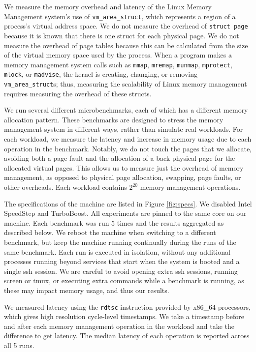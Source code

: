 \documentclass[twocolumn,11pt]{article}
\begin{document}
We measure the memory overhead and latency of the Linux Memory Management
system's use of \texttt{vm\_area\_struct}, which represents a region of a
process's virtual address space.  We do not measure the overhead of
\texttt{struct page} because it is known that there is one struct for each
physical page. We do not measure the overhead of page tables because this can be
calculated from the size of the virtual memory space used by the process.  When
a program makes a memory management system calls such as \texttt{mmap},
\texttt{mremap}, \texttt{munmap}, \texttt{mprotect}, \texttt{mlock}, or
\texttt{madvise}, the kernel is creating, changing, or removing
\texttt{vm\_area\_struct}s; thus, measuring the scalability of Linux memory
management requires measuring the overhead of these structs.

We run several different microbenchmarks, each of which has a different memory
allocation pattern. These benchmarks are designed to stress the memory
management system in different ways, rather than simulate real workloads. For
each workload, we measure the latency and increase in memory usage due to each
operation in the benchmark. Notably, we do not touch the pages that we allocate,
avoiding both a page fault and the allocation of a back physical page for the
allocated virtual pages. This allows us to measure just the overhead of memory
management, as opposed to physical page allocation, swapping, page faults, or
other overheads.  Each workload contains $2^{20}$ memory management operations.

The specifications of the machine are listed in Figure \ref{fig:specs}. We
disabled Intel SpeedStep and TurboBoost. All experiments are pinned to the same
core on our machine. Each benchmark was run 5 times and the results aggregated
as described below. We reboot the machine when switching to a different
benchmark, but keep the machine running continually during the runs of the same
benchmark. Each run is executed in isolation, without any additional processes
running beyond services that start when the system is booted and a single ssh
session. We are careful to avoid opening extra ssh sessions, running screen or
tmux, or executing extra commands while a benchmark is running, as these may
impact memory usage, and thus our results.

We measured latency using the \texttt{rdtsc} instruction provided by x86\_64
processors, which gives high resolution cycle-level timestamps. We take a
timestamp before and after each memory management operation in the workload and
take the difference to get latency. The median latency of each operation is
reported across all 5 runs.
\end{document}
